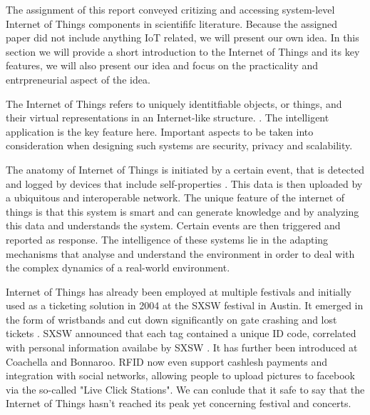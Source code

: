 The assignment of this report conveyed critizing and accessing system-level Internet of Things components in scientififc literature.
Because the assigned paper \cite{paper} did not include anything IoT related, we will present our own idea.
In this section we will provide a short introduction to the Internet of Things and its key features, we will also present our idea and focus on the practicality and entrpreneurial aspect of the idea.

The Internet of Things refers to uniquely identitfiable objects, or things, and their virtual representations in an Internet-like structure. \cite{lecture}.
The intelligent application is the key feature here.
Important aspects to be taken into consideration when designing such systems are security, privacy and scalability.

The anatomy of Internet of Things is initiated by a certain event, that is detected and logged by devices that include self-properties \cite{lecture}.
This data is then uploaded by a ubiquitous and interoperable network.
The unique feature of the internet of things is that this system is smart and can generate knowledge and by analyzing this data and understands the system.
Certain events are then triggered and reported as response.
The intelligence of these systems lie in the adapting mechanisms that analyse and understand the environment in order to deal with the complex dynamics of a real-world environment.

Internet of Things has already been employed at multiple festivals and initially used as a ticketing solution in 2004 at the SXSW festival in Austin.
It emerged in the form of wristbands and cut down significantly on gate crashing and lost tickets \cite{thingmagic}.
SXSW announced that each tag contained a unique ID code, correlated with personal information availabe by SXSW \cite{sxsw}.
It has further been introduced at Coachella and Bonnaroo. \cite{coachella} \cite{bonnaroo}
RFID now even support cashlesh payments and integration with social networks, allowing people to upload pictures to facebook via the so-called "Live Click Stations"\cite{thingmagic}.
We can conlude that it safe to say that the Internet of Things hasn't reached its peak yet concerning festival and concerts.

